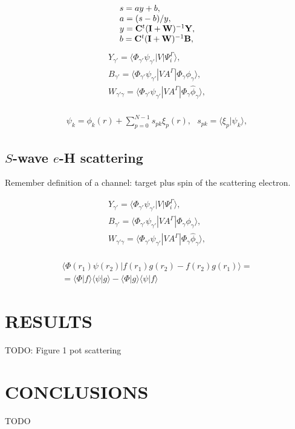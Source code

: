 \documentclass[aip
, pra
, showpacs
, aps
, twocolumn
, groupedaddress
, floatfix
]{revtex4}
\newcommand{\beq}{\begin{equation}}
\newcommand{\eeq}{\end{equation}}
\newcommand{\barr}{\begin{array}}
\newcommand{\earr}{\end{array}}
\begin{document}
\beq \barr{l}
s = a y  + b,   \\
a = (s - b) / y,\\
y = {\bf C}^t ({\bf I}+{\bf W})^{-1}  {\bf Y}, \\
b = {\bf C}^t ({\bf I}+{\bf W})^{-1}  {\bf B},
\earr \eeq
\beq \barr{l}
Y_{\gamma'} = \langle \Phi_{\gamma'}  \psi_{\gamma'} |V |\Psi_i^{\Gamma} \rangle,\\
B_{\gamma'} = \langle \Phi_{\gamma'}  \psi_{\gamma'} |V A^{\Gamma} |\Phi_{\gamma} \phi_{\gamma} \rangle,\\
W_{\gamma' \gamma} = \langle \Phi_{\gamma'}  \psi_{\gamma'} |V A^{\Gamma} |\Phi_{\gamma} \widehat{\phi}_{\gamma} \rangle,\\
\earr \label{Psi_} \eeq

\beq \barr{l}
\psi_k = \phi_k(r) +  \sum_{p=0}^{N-1} s_{pk} \xi_p(r), \ \ \ s_{pk} = \langle \xi_p | \psi_k \rangle,
\earr \label{Psi_} \eeq


\subsection{$S$-wave $e$-H scattering}

Remember definition of a channel: target plus spin of the scattering electron.


\beq \barr{l}
Y_{\gamma'} = \langle \Phi_{\gamma'}  \psi_{\gamma'} |V|\Psi_i^{\Gamma} \rangle,\\
B_{\gamma'} = \langle  \Phi_{\gamma'}  \psi_{\gamma'} |VA^{\Gamma} |\Phi_{\gamma} \phi_{\gamma} \rangle,\\
W_{\gamma' \gamma} = \langle \Phi_{\gamma'}  \psi_{\gamma'} |V A^{\Gamma} |\Phi_{\gamma} \widehat{\phi}_{\gamma} \rangle,\\
\earr \label{Psi_} \eeq

\beq \barr{l}
\langle  \Phi(r_1) \psi(r_2) |f(r_1) g(r_2) - f(r_2) g(r_1) \rangle = \\
=\langle  \Phi |f \rangle  \langle  \psi |g \rangle -
\langle  \Phi |g \rangle  \langle  \psi |f \rangle
\earr \eeq


\section{RESULTS}
TODO: Figure 1 pot scattering

\section{CONCLUSIONS}
TODO


\begin{acknowledgments}
\end{acknowledgments}





%
\end{document}

